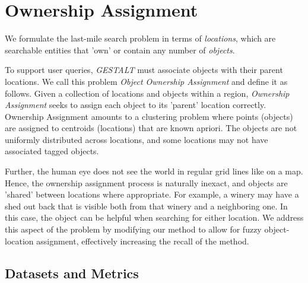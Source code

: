 \section{Ownership Assignment}
\label{section:ownership}

We formulate the last-mile search problem in terms of \textit{locations}, which are searchable entities that 'own' or contain any number of \textit{objects}. %

To support user queries, \emph{GESTALT} must associate objects with their parent locations.
We call this problem \textit{Object Ownership Assignment} and define it as follows.
Given a collection of locations and objects within a region, \emph{Ownership Assignment} seeks to assign each object to its 'parent' location correctly. 
Ownership Assignment amounts to a clustering problem where points (objects) are assigned to centroids (locations) that are known apriori. 
The objects are not uniformly distributed across locations, and some locations may not have associated tagged objects. 

Further, the human eye does not see the world in regular grid lines like on a map. Hence, the ownership assignment process is naturally inexact, and objects are 'shared' between locations where appropriate.
For example, a winery may have a shed out back that is visible both from that winery and a neighboring one. 
In this case, the object can be helpful when searching for either location. 
We address this aspect of the problem by modifying our method to allow for fuzzy object-location assignment, effectively increasing the recall of the method. 

\subsection{Datasets and Metrics}

